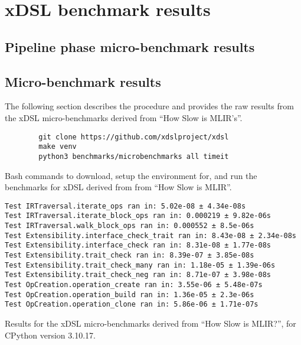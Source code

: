 \chapter{xDSL benchmark results}
\label{chap:xdsl-benchmark-results}

\section{Pipeline phase micro-benchmark results}

\section{Micro-benchmark results}

The following section describes the procedure and provides the raw results from the xDSL micro-benchmarks derived from ``How Slow is MLIR's''.

\vspace{2em}

\begin{code}
    \begin{verbatim}
        git clone https://github.com/xdslproject/xdsl
        make venv
        python3 benchmarks/microbenchmarks all timeit
    \end{verbatim}
    \caption{Bash commands to download, setup the environment for, and run the benchmarks for xDSL derived from from ``How Slow is MLIR''.}
    \label{listing:bash-xdsl-ubench-run}
\end{code}

\vspace{2em}

\begin{code}
    \begin{verbatim}
Test IRTraversal.iterate_ops ran in: 5.02e-08 ± 4.34e-08s
Test IRTraversal.iterate_block_ops ran in: 0.000219 ± 9.82e-06s
Test IRTraversal.walk_block_ops ran in: 0.000552 ± 8.5e-06s
Test Extensibility.interface_check_trait ran in: 8.43e-08 ± 2.34e-08s
Test Extensibility.interface_check ran in: 8.31e-08 ± 1.77e-08s
Test Extensibility.trait_check ran in: 8.39e-07 ± 3.85e-08s
Test Extensibility.trait_check_many ran in: 1.18e-05 ± 1.39e-06s
Test Extensibility.trait_check_neg ran in: 8.71e-07 ± 3.98e-08s
Test OpCreation.operation_create ran in: 3.55e-06 ± 5.48e-07s
Test OpCreation.operation_build ran in: 1.36e-05 ± 2.3e-06s
Test OpCreation.operation_clone ran in: 5.86e-06 ± 1.71e-07s
    \end{verbatim}
    \caption{Results for the xDSL micro-benchmarks derived from ``How Slow is MLIR?'', for CPython version 3.10.17.}
    \label{listing:how-slow-is-mlir-xdsl-microbenchmark-results}
\end{code}

